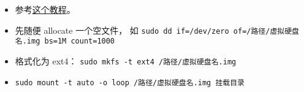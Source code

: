 
\begin{issues}
\issueDraft
\end{issues}

\begin{itemize}
\item 参考\href{https://www.tecmint.com/create-virtual-harddisk-volume-in-linux/}{这个教程}。
\item 先随便 allocate 一个空文件， 如 \verb|sudo dd if=/dev/zero of=/路径/虚拟硬盘名.img bs=1M count=1000|
\item 格式化为 ext4： \verb|sudo mkfs -t ext4 /路径/虚拟硬盘名.img|
\item \verb|sudo mount -t auto -o loop /路径/虚拟硬盘名.img 挂载目录|
\end{itemize}
